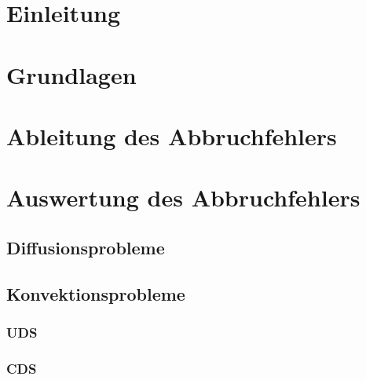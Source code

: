 \documentclass[bigchapter,twoside,report,11pt,type=bsc,colorback,accentcolor=tud2c]{tudthesis}
\begin{document}

  \tableofcontents

  \chapter{Einleitung}
  

\chapter{Grundlagen}

  
  
  
  
  




  \chapter{Ableitung des Abbruchfehlers}
  
  
  

  \chapter{Auswertung des Abbruchfehlers}
  \section{Diffusionsprobleme}
  \section{Konvektionsprobleme}
  \subsection{UDS}
  \subsection{CDS}
\end{document}
